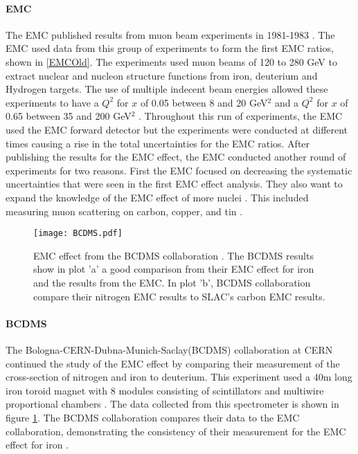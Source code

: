 \paragraph{EMC} The EMC published results from muon beam experiments in 1981-1983 \cite{EMC_iron,EM,EMC_F2d,CERN_EMC}.  The EMC used data from this group of experiments to form the first EMC ratios, shown in \ref{EMCOld}. The experiments used muon beams of 120 to 280 GeV to extract nuclear and nucleon structure functions from iron, deuterium and Hydrogen targets. The use of multiple indecent beam energies allowed these experiments to have a $Q^2$ for $x$ of 0.05 between 8 and 20 GeV$^2$ and a $Q^2$ for $x$ of 0.65 between 35 and 200 GeV$^2$ \cite{CERN_EMC}. Throughout this run of experiments, the EMC used the EMC forward detector but the experiments were conducted at different times causing a rise in the total uncertainties for the EMC ratios\cite{EM}. After publishing the results for the EMC effect, the EMC conducted another round of experiments for two reasons. First the EMC focused on decreasing the systematic uncertainties that were seen in the first EMC effect analysis. They also want to expand the knowledge of the EMC effect of more nuclei \cite{EMC_ext, Ajth}. This included measuring muon scattering on carbon, copper, and tin \cite{EMC_ext}.

\begin{figure}[H]
	\caption{EMC effect from the BCDMS collaboration \cite{BCDMS}. The BCDMS results show in plot 'a' a good comparison from their EMC effect for iron and the results from the EMC. In plot 'b', BCDMS collaboration compare their nitrogen EMC results to SLAC's carbon EMC results.}
	\label{fig:BCDMS}
	\centering
	\texttt{[image: BCDMS.pdf]}
\end{figure}
\paragraph{BCDMS}The Bologna-CERN-Dubna-Munich-Saclay(BCDMS) collaboration at CERN continued the study of the EMC effect by comparing their measurement of the cross-section of nitrogen and iron to deuterium. This experiment used a 40m long iron toroid magnet with 8 modules consisting of scintillators and multiwire proportional chambers \cite{BCDMS}. The data collected from this spectrometer is shown in figure \ref{fig:BCDMS}. The BCDMS collaboration compares their data to the EMC collaboration, demonstrating the consistency of their measurement for the EMC effect for iron \cite{BCDMS,Norton}.

